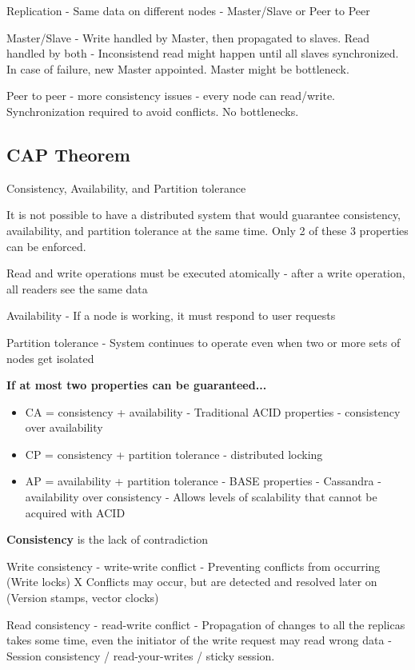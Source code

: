 Replication - Same data on different nodes - Master/Slave or Peer to Peer

Master/Slave - Write handled by Master, then propagated to slaves. Read handled by both - Inconsistend read might happen until all slaves synchronized. In case of failure, new Master appointed. Master might be bottleneck.

Peer to peer - more consistency issues - every node can read/write. Synchronization required to avoid conflicts. No bottlenecks.

\subsection{CAP Theorem}
Consistency, Availability, and Partition tolerance

It is not possible to have a distributed system that would guarantee consistency, availability, and partition tolerance at the same time. Only 2 of these 3 properties can be enforced.

Read and write operations must be executed atomically - after a write operation, all readers see the same data

Availability - If a node is working, it must respond to user requests

Partition tolerance - System continues to operate even when two or more sets of nodes get isolated


\textbf{If at most two properties can be guaranteed...}
\begin{itemize}
    \item CA = consistency + availability - Traditional ACID properties - consistency over availability
    \item CP = consistency + partition tolerance - distributed locking
    \item AP = availability + partition tolerance - BASE properties - Cassandra - availability over consistency - Allows levels of scalability that cannot be acquired with ACID
\end{itemize}

\textbf{Consistency} is the lack of contradiction

Write consistency - write-write conflict - Preventing conflicts from occurring (Write locks) X Conflicts may occur, but are detected and resolved later on (Version stamps, vector clocks)

Read consistency - read-write conflict - Propagation of changes to all the replicas takes some time, even the initiator of the write request may read wrong data - Session consistency / read-your-writes / sticky session.


